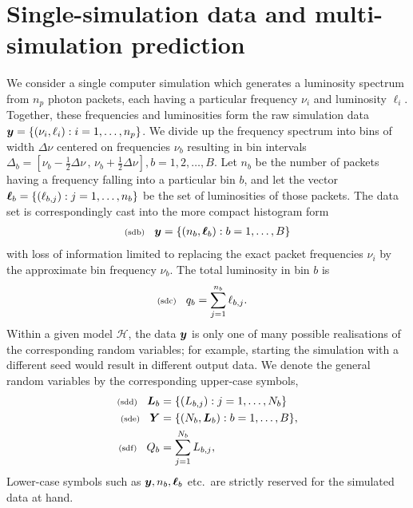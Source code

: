 \documentclass[11pt]{article}
\newcommand{\lleq}[1]{\label{#1} }
\renewcommand{\lleq}[1]{\label{#1} {\scriptstyle {\rm (#1)}} \hspace*{2ex} }
\newcommand{\hypo}  {{\mathcal{H}}}  %
\newcommand{\npack}{{n_p}}
\newcommand{\Lumtot}{Q}
\newcommand{\lumtot}{q}
\newcommand{\Lum}{L}
\newcommand{\lum}{\ell}
\begin{document}
\section{Single-simulation data and multi-simulation prediction}


We consider a single computer simulation which generates a luminosity
spectrum from $\npack$ photon packets, each having a particular
frequency $\nu_i$ and luminosity $\lum_i$. Together, these frequencies
and luminosities form the raw simulation data
$\bmy = \{ (\nu_i,\lum_i): i = 1,\ldots,\npack\}$.  We divide up the
frequency spectrum into bins of width $\Delta\nu$ centered on
frequencies $\nu_b$ resulting in bin intervals
$\Delta_b = [\nu_b {-} \tfrac{1}{2} \Delta\nu \,,\, \nu_b {+}
\tfrac{1}{2} \Delta\nu], b = 1,2,\ldots, B$. Let $n_b$ be the number
of packets having a frequency falling into a particular bin $b$, and
let the vector ${\bm{\ell}}_b = \{(\ell_{b,j}): j = 1,\ldots,n_b\}$ be the
set of luminosities of those packets. The data set is correspondingly
cast into the more compact histogram form
\begin{align}
  \lleq{sdb}
  \bmy = \{(n_b,\bml_b): b = 1,\ldots,B\}
\end{align}
with loss of information limited to replacing the exact packet
frequencies $\nu_i$ by the approximate bin frequency $\nu_b$. The
total luminosity in bin $b$ is
\begin{align}
  \lleq{sdc}
  \lumtot_b 
  &= \sum_{j=1}^{n_b} \lum_{b,j}.
\end{align}
Within a given model $\hypo$, the data ${\bm{y}}$ is only one of many
possible realisations of the corresponding random variables; for
example, starting the simulation with a different seed would result in
different output data. We denote the general random variables by the
corresponding upper-case symbols,
\begin{align}
  \lleq{sdd}
  \bmL_b &= \{(\Lum_{b,j}): j = 1,\ldots,N_b\}\\
  \lleq{sde}
  \bmY &= \{(N_b, \bmL_b): b = 1,\ldots,B\},\\
  \lleq{sdf}
  \Lumtot_b &= \sum_{j=1}^{N_b} \Lum_{b,j},
\end{align}
Lower-case symbols such as ${\bm{y}}, n_b,{\bm{\ell}}_b$ etc.\ are strictly
reserved for the simulated data at hand.
\end{document}
